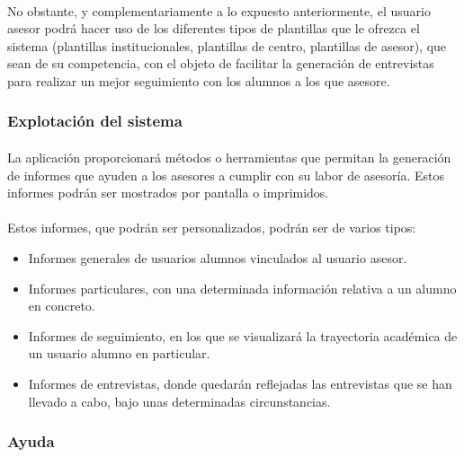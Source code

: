       \paragraph{}No obstante, y complementariamente a lo expuesto
      anteriormente, el usuario asesor podrá hacer uso de los diferentes tipos
      de plantillas que le ofrezca el sistema (plantillas institucionales,
      plantillas de centro, plantillas de asesor), que sean de su competencia,
      con el objeto de facilitar la generación de entrevistas para realizar un
      mejor seguimiento con los alumnos a los que asesore.

      \subsubsection{Explotación del sistema}

      \paragraph{}La aplicación proporcionará métodos o herramientas que
      permitan la generación de informes que ayuden a los asesores a cumplir con
      su labor de asesoría. Estos informes podrán ser mostrados por pantalla o
      imprimidos.

      \paragraph{}Estos informes, que podrán ser personalizados, podrán ser
      de varios tipos:

      \begin{itemize}
       \item Informes generales de usuarios alumnos vinculados al usuario
             asesor.
       \item Informes particulares, con una determinada información relativa a
             un alumno en concreto.
       \item Informes de seguimiento, en los que se visualizará la trayectoria
             académica de un usuario alumno en particular.
       \item Informes de entrevistas, donde quedarán reflejadas las entrevistas
             que se han llevado a cabo, bajo unas determinadas circunstancias.
      \end{itemize}

      \subsubsection{Ayuda}

